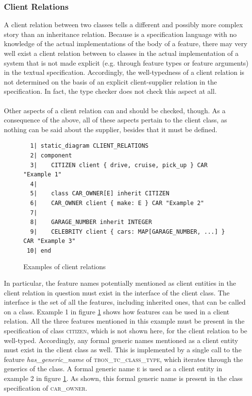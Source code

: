 \subsubsection{Client Relations}
A client relation between two classes tells a different and possibly more complex story than an inheritance relation. Because \bon{} is a specification language with no knowledge of the actual implementations of the body of a feature, there may very well exist a client relation between to classes in the actual implementation of a system that is not made explicit (e.g. through feature types or feature arguments) in the textual \bon{} specification. Accordingly, the well-typedness of a client relation is not determined on the basis of an explicit client-supplier relation in the specification. In fact, the type checker does not check this aspect at all.
\paragraph{}
Other aspects of a client relation can and should be checked, though. As a consequence of the above, all of these aspects pertain to the client class, as nothing can be said about the supplier, besides that it must be defined.
\begin{figure}[H]
{\footnotesize
\begin{verbatim}
  1| static_diagram CLIENT_RELATIONS
  2| component
  3|    CITIZEN client { drive, cruise, pick_up } CAR "Example 1"
  4|  
  5|    class CAR_OWNER[E] inherit CITIZEN
  6|    CAR_OWNER client { make: E } CAR "Example 2"
  7| 
  8|    GARAGE_NUMBER inherit INTEGER
  9|    CELEBRITY client { cars: MAP[GARAGE_NUMBER, ...] } CAR "Example 3"
 10| end
\end{verbatim}
}
\caption{Examples of client relations}
\label{fig:client_relations}
\end{figure}
In particular, the feature names potentially mentioned as client entities in the client relation in question must exist in the interface of the client class. The interface is the set of all the features, including inherited ones, that can be called on a class. Example 1 in figure \ref{fig:client_relations} shows how features can be used in a client relation. All the three features mentioned in this example must be present in the specification of class \textsc{citizen}, which is not shown here, for the client relation to be well-typed.
Accordingly, any formal generic names mentioned as a client entity must exist in the client class as well. This is implemented by a single call to the feature \textit{has\_generic\_name} of \textsc{tbon\_tc\_class\_type}, which iterates through the generics of the class. A formal generic name \textsc{e} is used as a client entity in example 2 in figure \ref{fig:client_relations}. As shown, this formal generic name is present in the class specification of \textsc{car\_owner}.

